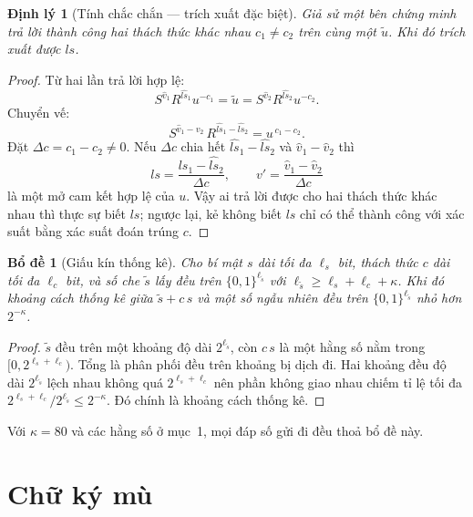 \documentclass[a4paper,11pt]{article}
\theoremstyle{definition}
\theoremstyle{plain}
\newtheorem{theorem}[definition]{Định lý}
\newtheorem{lemma}[definition]{Bổ đề}
\theoremstyle{remark}
\begin{document}
\begin{theorem}[Tính chắc chắn --- trích xuất đặc biệt]
\label{thm:soundness}
Giả sử một bên chứng minh trả lời thành công hai thách thức khác nhau $c_1\neq c_2$ trên
cùng một $\tilde u$. Khi đó trích xuất được $\mathit{ls}$.
\end{theorem}

\begin{proof}
Từ hai lần trả lời hợp lệ:
\[
S^{\hat v_1} R^{\widehat{\mathit{ls}}_1} u^{-c_1} = \tilde u
= S^{\hat v_2} R^{\widehat{\mathit{ls}}_2} u^{-c_2}.
\]
Chuyển vế:
\[
S^{\hat v_1-\hat v_2}\,R^{\widehat{\mathit{ls}}_1-\widehat{\mathit{ls}}_2}
= u^{\,c_1-c_2}.
\]
Đặt $\Delta c=c_1-c_2\neq 0$. Nếu $\Delta c$ chia hết
$\widehat{\mathit{ls}}_1-\widehat{\mathit{ls}}_2$ và $\hat v_1-\hat v_2$ thì
\[
\mathit{ls}=\frac{\widehat{\mathit{ls}}_1-\widehat{\mathit{ls}}_2}{\Delta c},
\qquad
v'=\frac{\hat v_1-\hat v_2}{\Delta c}
\]
là một mở cam kết hợp lệ của $u$. Vậy ai trả lời được cho hai thách thức khác nhau thì
thực sự biết $\mathit{ls}$; ngược lại, kẻ không biết $\mathit{ls}$ chỉ có thể thành công
với xác suất bằng xác suất đoán trúng $c$.
\end{proof}

\begin{lemma}[Giấu kín thống kê]
\label{lem:stat}
Cho bí mật $s$ dài tối đa $\ell_s$ bit, thách thức $c$ dài tối đa $\ell_c$ bit, và số che
$\tilde s$ lấy đều trên $\{0,1\}^{\ell_{\tilde s}}$ với
$\ell_{\tilde s}\ge \ell_s+\ell_c+\kappa$. Khi đó khoảng cách thống kê giữa
$\tilde s + c\,s$ và một số ngẫu nhiên đều trên $\{0,1\}^{\ell_{\tilde s}}$ nhỏ hơn
$2^{-\kappa}$.
\end{lemma}

\begin{proof}
$\tilde s$ đều trên một khoảng độ dài $2^{\ell_{\tilde s}}$, còn $c\,s$ là một hằng số
nằm trong $[0,2^{\ell_s+\ell_c})$. Tổng là phân phối đều trên khoảng bị dịch đi. Hai
khoảng đều độ dài $2^{\ell_{\tilde s}}$ lệch nhau không quá $2^{\ell_s+\ell_c}$ nên phần
không giao nhau chiếm tỉ lệ tối đa $2^{\ell_s+\ell_c}/2^{\ell_{\tilde s}} \le 2^{-\kappa}$.
Đó chính là khoảng cách thống kê.
\end{proof}

\noindent Với $\kappa=80$ và các hằng số ở mục~1, mọi đáp số gửi đi đều thoả bổ đề này.

\section{Chữ ký mù}
\end{document}
